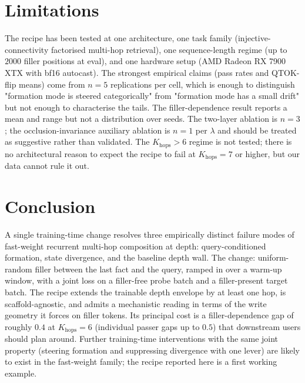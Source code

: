 \documentclass[11pt]{article}
\begin{document}
\section{Limitations}
\label{sec:limitations}

The recipe has been tested at one architecture, one task family
(injective-connectivity factorised multi-hop retrieval), one
sequence-length regime (up to $2000$ filler positions at eval), and
one hardware setup (AMD Radeon RX 7900 XTX with bf16 autocast). The strongest
empirical claims (pass rates and QTOK-flip means) come from
$n = 5$ replications per cell, which is enough to distinguish
"formation mode is steered categorically" from "formation mode has
a small drift" but not enough to characterise the tails. The
filler-dependence result reports a mean and range but not a
distribution over seeds. The two-layer ablation is $n = 3$; the
occlusion-invariance auxiliary ablation is $n = 1$ per $\lambda$
and should be treated as suggestive rather than validated. The
$K_{\mathrm{hops}} > 6$ regime is not tested; there is no
architectural reason to expect the recipe to fail at
$K_{\mathrm{hops}} = 7$ or higher, but our data cannot rule it out.

\section{Conclusion}
\label{sec:conclusion}

A single training-time change resolves three empirically distinct
failure modes of fast-weight recurrent multi-hop composition at
depth: query-conditioned formation, state divergence, and the
baseline depth wall. The change: uniform-random filler between the
last fact and the query, ramped in over a warm-up window, with a
joint loss on a filler-free probe batch and a filler-present target
batch. The recipe extends the trainable depth envelope by at least
one hop, is scaffold-agnostic, and admits a mechanistic reading in
terms of the write geometry it forces on filler tokens. Its
principal cost is a filler-dependence gap of roughly $0.4$ at
$K_{\mathrm{hops}}=6$ (individual passer gaps up to $0.5$) that
downstream users should plan around.
Further training-time interventions with the same joint property
(steering formation and suppressing divergence with one lever) are
likely to exist in the fast-weight family; the recipe reported here
is a first working example.



\end{document}
